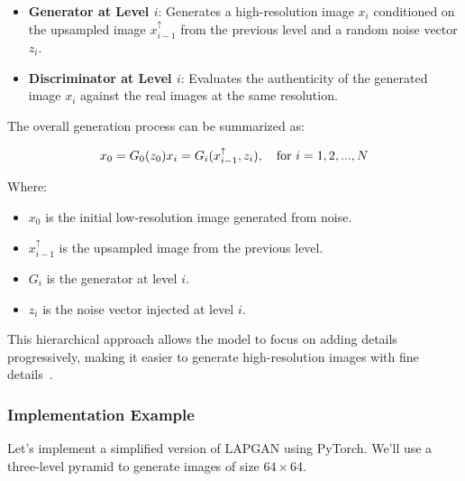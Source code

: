 \begin{itemize}
    \item \textbf{Generator at Level \( i \)}: Generates a high-resolution image \( x_i \) conditioned on the upsampled image \( x_{i-1}^{\uparrow} \) from the previous level and a random noise vector \( z_i \).
    \item \textbf{Discriminator at Level \( i \)}: Evaluates the authenticity of the generated image \( x_i \) against the real images at the same resolution.
\end{itemize}

The overall generation process can be summarized as:

\[
x_0 = G_0(z_0) \\
x_i = G_i(x_{i-1}^{\uparrow}, z_i), \quad \text{for } i = 1, 2, ..., N
\]

Where:
\begin{itemize}
    \item \( x_0 \) is the initial low-resolution image generated from noise.
    \item \( x_{i-1}^{\uparrow} \) is the upsampled image from the previous level.
    \item \( G_i \) is the generator at level \( i \).
    \item \( z_i \) is the noise vector injected at level \( i \).
\end{itemize}

This hierarchical approach allows the model to focus on adding details progressively, making it easier to generate high-resolution images with fine details~\cite{denton2015deep}.

\subsubsection{Implementation Example}

Let's implement a simplified version of LAPGAN using PyTorch. We'll use a three-level pyramid to generate images of size \( 64 \times 64 \).

